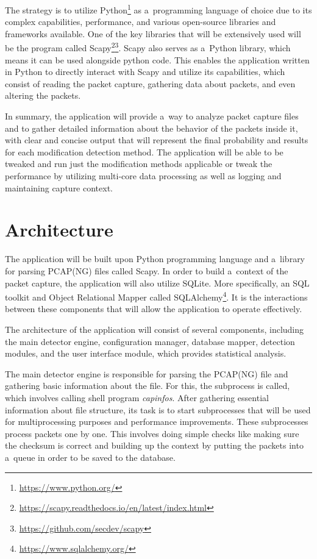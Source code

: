 \documentclass[
  printed,     %
  color,       %
  oneside,     %
  nosansbold,  %
  nocolorbold, %
  nolof,         %
  nolot,         %
]{fithesis4}
\begin{document}
The strategy is to utilize Python\footnote{\url{https://www.python.org/}} as a~programming language of choice due to its complex capabilities, performance, and various open-source libraries and frameworks available. One of the key libraries that will be extensively used will be the program called Scapy\footnote{\url{https://scapy.readthedocs.io/en/latest/index.html}}\footnote{\url{https://github.com/secdev/scapy}}. Scapy also serves as a~Python library, which means it can be used alongside python code. This enables the application written in Python to directly interact with Scapy and utilize its capabilities, which consist of reading the packet capture, gathering data about packets, and even altering the packets. 

In summary, the application will provide a~way to analyze packet capture files and to gather detailed information about the behavior of the packets inside it, with clear and concise output that will represent the final probability and results for each modification detection method. The application will be able to be tweaked and run just the modification methods applicable or tweak the performance by utilizing multi-core data processing as well as logging and maintaining capture context.

\section{Architecture}

The application will be built upon Python programming language and a~library for parsing PCAP(NG) files called Scapy. In order to build a~context of the packet capture, the application will also utilize SQLite. More specifically, an SQL toolkit and Object Relational Mapper called SQLAlchemy\footnote{\url{https://www.sqlalchemy.org/}}. It is the interactions between these components that will allow the application to operate effectively.

The architecture of the application will consist of several components, including the main detector engine, configuration manager, database mapper, detection modules, and the user interface module, which provides statistical analysis.

The main detector engine is responsible for parsing the PCAP(NG) file and gathering basic information about the file. For this, the subprocess is called, which involves calling shell program \textit{capinfos}. After gathering essential information about file structure, its task is to start subprocesses that will be used for multiprocessing purposes and performance improvements. These subprocesses process packets one by one. This involves doing simple checks like making sure the checksum is correct and building up the context by putting the packets into a~queue in order to be saved to the database.
\end{document}
